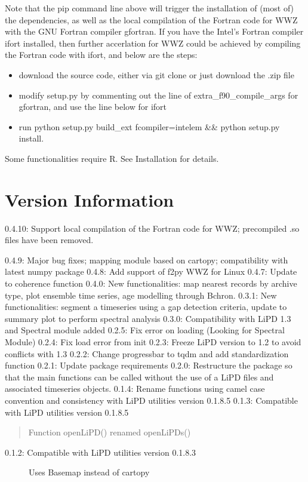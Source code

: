 \documentclass[letterpaper,10pt,english]{sphinxmanual}
\begin{document}
Note that the pip command line above will trigger the installation of (most of) the dependencies, as well as the local compilation of the Fortran code for WWZ with the GNU Fortran compiler gfortran. If you have the Intel’s Fortran compiler ifort installed, then further accerlation for WWZ could be achieved by compiling the Fortran code with ifort, and below are the steps:
\begin{itemize}
\item {} 
download the source code, either via git clone or just download the .zip file

\item {} 
modify setup.py by commenting out the line of extra\_f90\_compile\_args for gfortran, and use the line below for ifort

\item {} 
run python setup.py build\_ext \textendash{}fcompiler=intelem \&\& python setup.py install.

\end{itemize}

Some functionalities require R. See Installation for details.


\section{Version Information}
\label{\detokenize{Introduction:version-information}}
0.4.10: Support local compilation of the Fortran code for WWZ; precompiled .so files have been removed.

0.4.9: Major bug fixes; mapping module based on cartopy; compatibility with latest numpy package
0.4.8: Add support of f2py WWZ for Linux
0.4.7: Update to coherence function
0.4.0: New functionalities: map nearest records by archive type, plot ensemble time series, age modelling through Bchron.
0.3.1: New functionalities: segment a timeseries using a gap detection criteria, update to summary plot to perform spectral analysis
0.3.0: Compatibility with LiPD 1.3 and Spectral module added
0.2.5: Fix error on loading (Looking for Spectral Module)
0.2.4: Fix load error from init
0.2.3: Freeze LiPD version to 1.2 to avoid conflicts with 1.3
0.2.2: Change progressbar to tqdm and add standardization function
0.2.1: Update package requirements
0.2.0: Restructure the package so that the main functions can be called without the use of a LiPD files and associated timeseries objects.
0.1.4: Rename functions using camel case convention and consistency with LiPD utilities version 0.1.8.5
0.1.3: Compatible with LiPD utilities version 0.1.8.5
\begin{quote}

Function openLiPD() renamed openLiPDs()
\end{quote}
\begin{description}
\item[{0.1.2: Compatible with LiPD utilities version 0.1.8.3}] \leavevmode
Uses Basemap instead of cartopy

\end{description}
\end{document}
